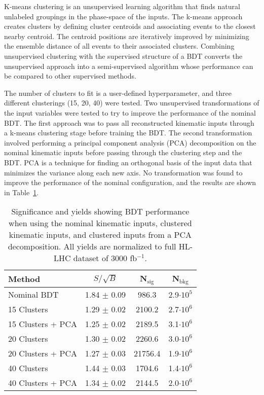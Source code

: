 \label{sec:kmeans}
K-means clustering is an unsupervised learning algorithm that finds natural unlabeled groupings in the phase-space of the inputs. The k-means approach creates clusters by defining cluster centroids and associating events to the closest nearby centroid. The centroid positions are iteratively improved by minimizing the ensemble distance of all events to their associated clusters. Combining unsupervised clustering with the supervised structure of a BDT converts the unsupervised approach into a semi-supervised algorithm whose performance can be compared to other supervised methods.

The number of clusters to fit is a user-defined hyperparameter, and three different clusterings (15, 20, 40) were tested. Two unsupervised transformations of the input variables were tested to try to improve the performance of the nominal BDT. The first approach was to pass all reconstructed kinematic inputs through a k-means clustering stage before training the BDT. The second transformation involved performing a principal component analysis (PCA) decomposition on the nominal kinematic inputs before passing through the clustering step and the BDT. PCA is a technique for finding an orthogonal basis of the input data that minimizes the variance along each new axis. No transformation was found to improve the performance of the nominal configuration, and the results are shown in Table~\ref{tab:bdtPCACluster}.

\begin{table}[h!]
\label{tab:bdtPCACluster}
\begin{center}
    \begin{tabular}{|l|c|c|c|} %
      \hline\hline
      \textbf{Method} & $S/\sqrt{B}$ & N$_{\textrm{sig}}$ & N$_{\textrm{bkg}}$ \\
      \hline
      Nominal BDT & 1.84 $\pm$ 0.09 & 986.3  & 2.9$\cdot 10^5$ \\
      15 Clusters & 1.29 $\pm$ 0.02 & 2100.2 & 2.7$\cdot 10^6$ \\
      15 Clusters + PCA & 1.25 $\pm$ 0.02 & 2189.5 & 3.1$\cdot 10^6$ \\         
      20 Clusters & 1.30 $\pm$ 0.02 & 2260.6 & 3.0$\cdot 10^6$ \\
      20 Clusters + PCA & 1.27 $\pm$ 0.03 & 21756.4 & 1.9$\cdot 10^6$ \\         
      40 Clusters & 1.44 $\pm$ 0.03 & 1704.6 & 1.4$\cdot 10^6$ \\
      40 Clusters + PCA & 1.34 $\pm$ 0.02 & 2144.5 & 2.0$\cdot 10^6$ \\         
      \hline\hline
    \end{tabular}
    \caption{Significance and yields showing BDT performance when using the nominal kinematic inputs, clustered kinematic inputs, and clustered inputs from a PCA decomposition. All yields are normalized to full HL-LHC dataset of 3000 fb$^{-1}$.}
    \end{center}
\end{table}
